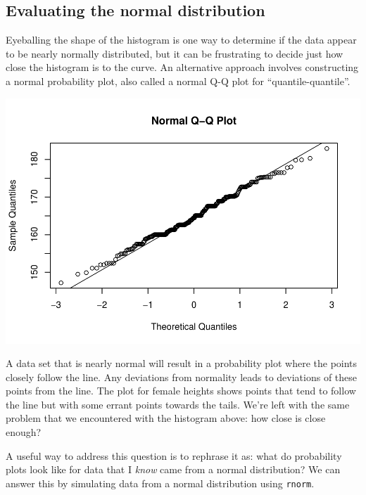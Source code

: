 \documentclass[]{article}
\newenvironment{Shaded}{\begin{snugshade}}{\end{snugshade}}
\newcommand{\KeywordTok}[1]{\textcolor[rgb]{0.13,0.29,0.53}{\textbf{{#1}}}}
\newcommand{\NormalTok}[1]{{#1}}
\begin{document}
\subsection{Evaluating the normal
distribution}\label{evaluating-the-normal-distribution}

Eyeballing the shape of the histogram is one way to determine if the
data appear to be nearly normally distributed, but it can be frustrating
to decide just how close the histogram is to the curve. An alternative
approach involves constructing a normal probability plot, also called a
normal Q-Q plot for ``quantile-quantile''.

\begin{Shaded}
\end{Shaded}

\includegraphics{Lab_3_files/figure-latex/qq-1.pdf}

A data set that is nearly normal will result in a probability plot where
the points closely follow the line. Any deviations from normality leads
to deviations of these points from the line. The plot for female heights
shows points that tend to follow the line but with some errant points
towards the tails. We're left with the same problem that we encountered
with the histogram above: how close is close enough?

A useful way to address this question is to rephrase it as: what do
probability plots look like for data that I \emph{know} came from a
normal distribution? We can answer this by simulating data from a normal
distribution using \texttt{rnorm}.
\end{document}
